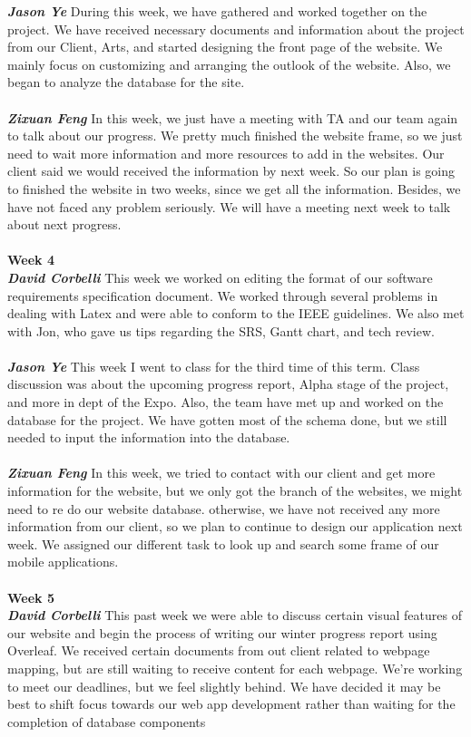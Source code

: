 \documentclass[onecolumn, draftclsnofoot,10pt, compsoc]{IEEEtran}
\begin{document}
\textbf{\textit{Jason Ye}}
During this week, we have gathered and worked together on the project. We have received necessary documents and information about the project from our Client, Arts, and started designing the front page of the website. We mainly focus on customizing and arranging the outlook of the website. Also, we began to analyze the database for the site.\\ \\
\textbf{\textit{Zixuan Feng}}
In this week, we just have a meeting with TA and our team again to talk about our progress. We pretty much finished the website frame, so we just need to wait more information and more resources to add in the websites. Our client said we would received the information by next week. So our plan is going to finished the website in two weeks, since we get all the information. Besides, we have not faced any problem seriously. We will have a meeting next week to talk about next progress.\\ \\
\textbf{Week 4}
\\ \textbf{\textit{David Corbelli}}
This week we worked on editing the format of our software requirements specification document. We worked through several problems in dealing with Latex and were able to conform to the IEEE guidelines. We also met with Jon, who gave us tips regarding the SRS, Gantt chart, and tech review.\\ \\
\textbf{\textit{Jason Ye}}
This week I went to class for the third time of this term. Class discussion was about the upcoming progress report, Alpha stage of the project, and more in dept of the Expo. Also, the team have met up and worked on the database for the project. We have gotten most of the schema done, but we still needed to input the information into the database. \\ \\
\textbf{\textit{Zixuan Feng}}
In this week, we tried to contact with our client and get more information for the website, but we only got the branch of the websites, we might need to re do our website database. otherwise, we have not received any more information from our client, so we plan to continue to design our application next week. We assigned our different task to look up and search some frame of our mobile applications.\\ \\
\textbf{Week 5}
\\ \textbf{\textit{David Corbelli}}
This past week we were able to discuss certain visual features of our website and begin the process of writing our winter progress report using Overleaf. We received certain documents from out client related to webpage mapping, but are still waiting to receive content for each webpage. We're working to meet our deadlines, but we feel slightly behind. We have decided it may be best to shift focus towards our web app development rather than waiting for the completion of database components\\ \\
\end{document}
